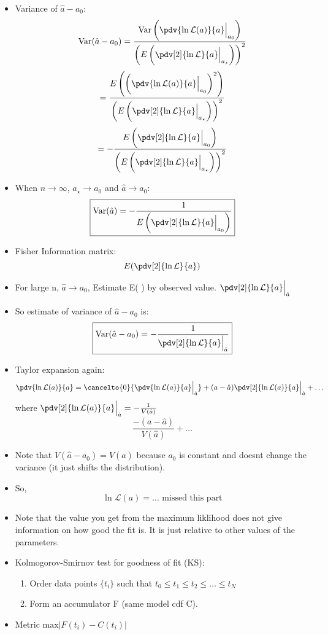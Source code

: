 \begin{itemize}
    \item Variance of $\hat{a}-a_0$:
          \[ \text{Var}(\hat{a} - a_0) = \frac{\text{Var}\left( \pdv{\ln \mathcal{L}(a)}{a} \Big|_{a_0} \right)}{\left( E\left( \pdv[2]{\ln \mathcal{L}}{a} \Big|_{a_{\star}} \right) \right)^2} \]
          \[ = \frac{E\left( \left( \pdv{\ln \mathcal{L}(a)}{a} \Big|_{a_0} \right)^2 \right)}{\left( E\left( \pdv[2]{\ln \mathcal{L}}{a} \Big|_{a_{\star}} \right) \right)^2} \]
          \[ = -\frac{E\left( \pdv[2]{\ln \mathcal{L}}{a} \Big|_{a_0} \right)}{\left( E\left( \pdv[2]{\ln \mathcal{L}}{a} \Big|_{a_{\star}} \right) \right)^2} \]
    \item When $n \to \infty$, $a_{\star} \to a_0$ and $\hat{a} \to a_0$:
          \[ \boxed{\text{Var}(\hat{a}) = -\frac{1}{E\left( \pdv[2]{\ln \mathcal{L}}{a} \Big|_{a_0} \right)} } \]
    \item Fisher Information matrix:
          \[ E( \pdv[2]{\ln \mathcal{L}}{a}) \]
    \item For large n, $\hat{a} \to a_0$, Estimate E( ) by observed value.  $\pdv[2]{\ln \mathcal{L}}{a} \Big|_{\hat{a}}$
    \item So estimate of variance of $\hat{a} - a_0$ is:
          \[ \boxed{\text{Var}(\hat{a}-a_0) = -\frac{1}{\pdv[2]{\ln \mathcal{L}}{a} \Big|_{\hat{a}}} } \]

    \item Taylor expansion again:
          \[ \pdv{\ln \mathcal{L}(a)}{a} = \cancelto{0}{\pdv{\ln \mathcal{L}(a)}{a} \Big|_{\hat{a}}} + (a - \hat{a}) \pdv[2]{\ln \mathcal{L}(a)}{a} \Big|_{\hat{a}} + \ldots \]
          where $\pdv[2]{\ln \mathcal{L}(a)}{a} \Big|_{\hat{a}} = -\frac{1}{V(\hat{a})}$
          \[ \frac{-(a-\hat{a})}{V(\hat{a})} + \ldots \]
    \item Note that $V(\hat{a} - a_0) = V(\hat{a})$ because $a_0$ is constant and doesnt change the variance (it just shifts the distribution).
    \item So,
          \[ \ln \mathcal{L}(a) = \ldots \text{ missed this part} \]
    \item Note that the value you get from the maximum liklihood does not give information on how good the fit is. It is just relative to other values of the parameters.
    \item Kolmogorov-Smirnov test for goodness of fit (KS):
          \begin{enumerate}
              \item Order data points $\{t_i\}$ such that $t_0 \leq t_1 \leq t_2 \leq \ldots \leq t_N$
              \item Form an accumulator F (same model cdf C).
          \end{enumerate}
    \item Metric $\text{max}|F(t_i) - C(t_i)|$
\end{itemize}